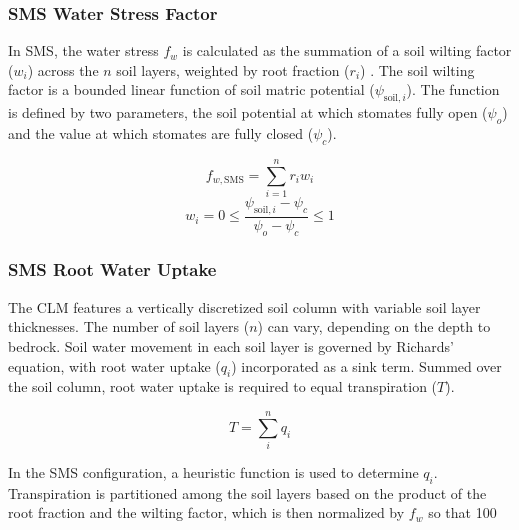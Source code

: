 \documentclass[draft,linenumbers]{agujournal}
\begin{document}
    \subsubsection{SMS Water Stress Factor}
    \label{sect:fwsms}
    
    In SMS, the water stress $f_w$ is calculated as the summation of a soil wilting factor ($w_i$) across the $n$ soil layers, weighted by root fraction ($r_i$) \citep{oleson2013}.
    The soil wilting factor is a bounded linear function of soil matric potential ($\psi_{\text{soil},i}$).
    The function is defined by two parameters, the soil potential at which stomates fully open ($\psi_o$) and the value at which stomates are fully closed ($\psi_c$).  

    \begin{linenomath*}
    \begin{equation}
     f_{w,\text{SMS}} = \sum_{i=1}^{n}{r_iw_i}
    \label{bt:1}
    \end{equation}
    \begin{equation} 
    \label{bt:2}
    w_i=0 \leq \dfrac{\psi_{\text{soil},i}-\psi_{c}}{\psi_{o}-\psi_{c}} \leq 1
    \end{equation}
    \end{linenomath*}
    
\subsubsection{SMS Root Water Uptake}
\label{sect:smsrwu}
    The CLM features a vertically discretized soil column with variable soil layer thicknesses.
    The number of soil layers ($n$) can vary, depending on the depth to bedrock.
    Soil water movement in each soil layer is governed by Richards' equation, with root water uptake ($q_i$) incorporated as a sink term.
    Summed over the soil column, root water uptake is required to equal transpiration ($T$).

    \begin{linenomath*}
    \begin{equation}
    T = \sum^n_i{q_i}
    \end{equation}
    \end{linenomath*} 
    
    In the SMS configuration, a heuristic function is used to determine $q_i$.
    Transpiration is partitioned among the soil layers based on the product of the root fraction and the wilting factor, which is then normalized by $f_w$ so that 100%
    
\end{document}
